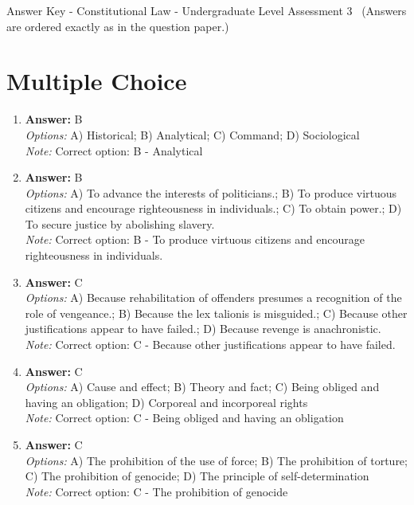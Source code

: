 \documentclass[12pt]{article}
\begin{document}
\begin{center}
Answer Key - Constitutional Law - Undergraduate Level Assessment 3 \
\small (Answers are ordered exactly as in the question paper.)
\end{center}

\section*{Multiple Choice}
\begin{enumerate}[label=\arabic*.]
\item \textbf{Answer:} B
\\ \textit{Options:} A) Historical; B) Analytical; C) Command; D) Sociological
\\ \textit{Note:} Correct option: B - Analytical
\item \textbf{Answer:} B
\\ \textit{Options:} A) To advance the interests of politicians.; B) To produce virtuous citizens and encourage righteousness in individuals.; C) To obtain power.; D) To secure justice by abolishing slavery.
\\ \textit{Note:} Correct option: B - To produce virtuous citizens and encourage righteousness in individuals.
\item \textbf{Answer:} C
\\ \textit{Options:} A) Because rehabilitation of offenders presumes a recognition of the role of vengeance.; B) Because the lex talionis is misguided.; C) Because other justifications appear to have failed.; D) Because revenge is anachronistic.
\\ \textit{Note:} Correct option: C - Because other justifications appear to have failed.
\item \textbf{Answer:} C
\\ \textit{Options:} A) Cause and effect; B) Theory and fact; C) Being obliged and having an obligation; D) Corporeal and incorporeal rights
\\ \textit{Note:} Correct option: C - Being obliged and having an obligation
\item \textbf{Answer:} C
\\ \textit{Options:} A) The prohibition of the use of force; B) The prohibition of torture; C) The prohibition of genocide; D) The principle of self-determination
\\ \textit{Note:} Correct option: C - The prohibition of genocide
\end{enumerate}
\end{document}
